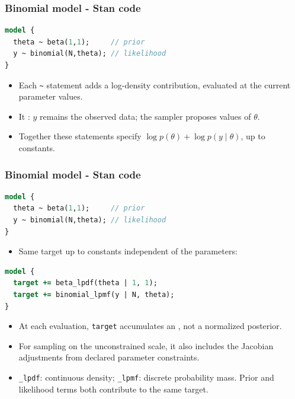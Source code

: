 \documentclass[10pt]{beamer}
\begin{document}
\begin{frame}[fragile]

\frametitle{Binomial model - Stan code}

  {\small
\begin{lstlisting}[language=Stan]
model {
  theta ~ beta(1,1);     // prior
  y ~ binomial(N,theta); // likelihood
}
\end{lstlisting}}

  \begin{itemize}
  \item Each \texttt{\textasciitilde} statement adds a log-density
    contribution, evaluated at the current parameter values.
  \item It :
    $y$ remains the observed data; the sampler proposes values of $\theta$.
  \item Together these statements specify
    $\log p(\theta)+\log p(y\mid\theta)$, up to constants.
  \end{itemize}

\end{frame}

\begin{frame}[fragile]

\frametitle{Binomial model - Stan code}

  {\small
\begin{lstlisting}[language=Stan]
model {
  theta ~ beta(1,1);     // prior
  y ~ binomial(N,theta); // likelihood
}
\end{lstlisting}}

    \vspace{-0.5\baselineskip}
    \begin{itemize}
    \item Same target up to constants independent of the parameters:
    \end{itemize}

  {\small
\begin{lstlisting}[language=Stan]
model {
  target += beta_lpdf(theta | 1, 1);
  target += binomial_lpmf(y | N, theta);
}
\end{lstlisting}}

    \vspace{-0.5\baselineskip}
    \begin{itemize}
    \item<2-> At each evaluation, \texttt{target} accumulates an
      , not a normalized posterior.
    \item<3-> For sampling on the unconstrained scale, it also includes
      the Jacobian adjustments from declared parameter constraints.
    \item<4-> \texttt{\_lpdf}: continuous density;
      \texttt{\_lpmf}: discrete probability mass.
      Prior and likelihood terms both contribute to the same target.
    \end{itemize}

\end{frame}
\end{document}
